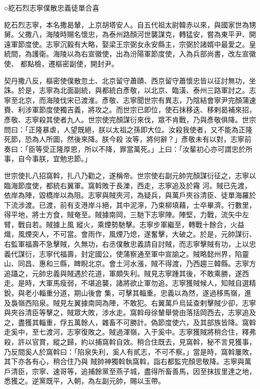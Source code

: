 
\begin{pinyinscope}

 ○紇石烈志寧僕散忠義徒單合喜



 紇石烈志寧，本名撒曷輦，上京胡塔安人。自五代祖太尉韓赤以來，與國家世為甥舅。父撒八，海陵時賜名懷忠，為泰州路顏河世襲謀克，轉猛安，嘗為東平尹、開遠軍節度使。志寧沉毅有大略，娶梁王宗弼女永安縣主，宗弼於諸婿中最愛之。皇統間，為護衛。海陵以為右宣徽使，出為汾陽軍節度使，入為兵部尚書，改左宣徽使、
 都點檢，遷樞密副使，開封尹。



 契丹撒八反，樞密使僕散忽土、北京留守蕭賾、西京留守蕭懷忠皆以征討無功，坐誅。於是，志寧為北面副統，與都統白彥敬，以北京、臨潢、泰州三路軍討之。志寧至北京，而海陵伐宋已渡淮。彥敬、志寧聞世宗有異志，乃陰結會寧尹完顏蒲速賚、利涉軍節度使獨吉義，將攻之。而世宗已即位，使石抹移迭、移剌曷補來招，彥敬、志寧殺其使者九人。世宗使完顏謀衍來伐，眾不肯戰，乃與彥敬俱降。世宗問曰：「正隆暴虐，人望既絕，朕以太祖之孫即大位。汝殺我使者，又不能為正隆死節，恐為人所圖，然後來降。朕今殺
 汝等，將何辭？」彥敬未有以對，志寧前奏曰：「臣等受正隆厚恩，所以不降，罪當萬死。」上曰：「汝輩初心亦可謂忠於所事，自今事朕，宜勉忠節。」


世宗使扎八招窩斡，扎八乃勸之，遂稱帝。世宗使右副元帥完顏謀衍征之，志寧以臨海節度使，都統右翼軍。窩斡敗于長濼，西走，志寧追及於霿
 河。賊已先渡，依岸為陣，毀橋岸以為阻。志寧與賊夾河，為疑兵，與萬戶夾谷清臣、徒單海羅於下流涉渡。已渡，前有支港岸斗絕，其中泥濘，乃束柳填藉，士卒畢濟。行數里，得平地，將士方食，賊奄至。賊據南岡，三馳下志寧陣。陣堅，力戰，流矢中左臂，戰自若。賊據上風
 縱火，乘煙勢馳擊。志寧步軍繼至，轉戰十餘合，火益熾，風煙突人，不可當。會雨作，風煙乃熄，遂奮擊，大破之。於是，元帥謀衍、右監軍福壽不急擊賊，久無功，右丞僕散忠義請自討賊，而志寧擊賊有功，上以忠義代謀衍，志寧代福壽，封定國公，使蒲察通至軍中宣諭之。賊略懿州界，陷靈山、同昌、惠和三縣，睥睨北京。會土河水漲，賊不得渡，乃西趨三韓縣。志寧方追躡之，元帥忠義與賊遇於花道，軍頗失利。賊見志寧踵其後，不敢乘勝，遂西走。是時，大軍馬瘦弱，不堪追襲，諸將欲止軍勿追。志寧獲賊候人，知賊自選精銳，與老小輜重分道，期山後會
 集，可擊其輜重。忠義以為然，遂過移馬嶺，進及裊嶺西陷泉。賊見左翼據南岡為陣，不敢犯。右翼萬戶烏延查剌擊賊少卻，志寧與夾谷清臣等擊之，賊眾大敗，涉水走。窩斡母徐輦舉營由落括岡西去，志寧追及之，盡獲其輜重，俘五萬餘人，雜畜不可勝計。偽節度使六，及其部族皆降。窩斡走奚中，至七渡河，志寧復敗之。賊過渾嶺，入于奚中。志寧獲賊將稍合住，釋弗殺，許以官賞，縱之歸，約以捕窩斡自效。稍合住既去，見窩斡，秘不言見獲事，乃反間奚人於窩斡曰：「陷泉失利，奚人有貳志，不可不察。」當是時，窩斡屢敗，其下亦各有心，稍合住乃與
 賊帥神獨斡執窩斡，詣右都監完顏思敬降。志寧與萬戶清臣，宗寧、速哥等，追捕餘黨至燕子城，盡得所畜善馬，因至抹拔里達之地，悉獲之。逆黨既平，入朝，為左副元帥，賜以玉帶。




\end{pinyinscope}
